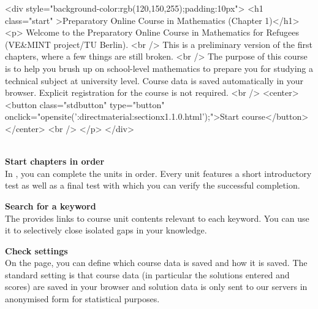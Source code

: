 \begin{MSectionStart}
\MGlobalStart
\begin{html}

<div style="background-color:rgb(120,150,255);padding:10px">
<h1 class="start" >Preparatory Online Course in Mathematics (Chapter 1)</h1>
<p>
Welcome to the Preparatory Online Course in Mathematics for Refugees (VE&MINT project/TU Berlin).
<br />
This is a preliminary version of the first chapters, where a few things are still broken.
<br />
The purpose of this course is to help you brush up on school-level mathematics to prepare you for studying a technical subject at university level.
Course data is saved automatically in your browser. Explicit registration for the course is not required.
<br />
<center><button class="stdbutton" type="button" onclick="opensite(':directmaterial:sectionx1.1.0.html');">Start course</button></center>
<br />
</p>
</div>
\end{html}

\ \\

\textbf{Start chapters in order}\\
In , you can complete the units in order. Every unit features a short introductory test
as well as a final test with which you can verify the successful completion. 

\textbf{Search for a keyword}\\
The  provides links to course unit contents relevant to each keyword.
You can use it to selectively close isolated gaps in your knowledge.

\textbf{Check settings}\\
On the  page, you can define which course data is saved and how it is saved.
The standard setting is that course data (in particular the solutions entered and scores) are saved in your
browser and solution data is only sent to our servers in anonymised form for statistical purposes.


\end{MSectionStart}
